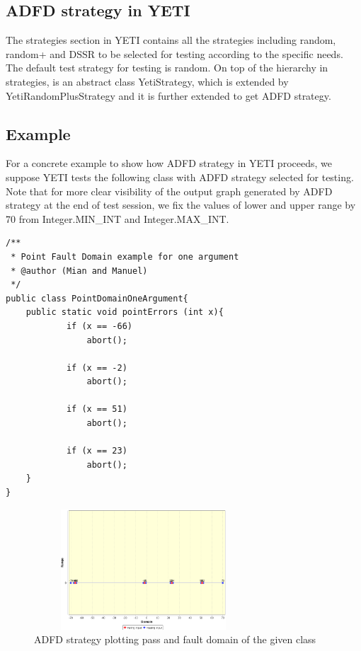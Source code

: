  \subsection{ADFD strategy in YETI}
The strategies section in YETI contains all the strategies including random, random+ and DSSR to be selected for testing according to the specific needs. The default test strategy for testing is random. On top of the hierarchy in strategies, is an abstract class YetiStrategy, which is extended by YetiRandomPlusStrategy and it is further extended to get ADFD strategy.
 

\subsection{Example}\label{sec:example}
For a concrete example to show how ADFD strategy in YETI proceeds, we suppose YETI tests the following class with ADFD strategy selected for testing. Note that for more clear visibility of the output graph generated by ADFD strategy at the end of test session, we fix the values of lower and upper range by 70 from Integer.MIN\_INT and Integer.MAX\_INT. 

\begin{lstlisting}
/**
 * Point Fault Domain example for one argument
 * @author (Mian and Manuel)
 */
public class PointDomainOneArgument{
	public static void pointErrors (int x){
     		if (x == -66)
       			abort();
     
     		if (x == -2)
     			abort();
      				
     		if (x == 51)
     			abort();
     
     		if (x == 23)
     			abort();
	}
}
\end{lstlisting}


\begin{figure}[H]
\centering
\includegraphics[width=8.2cm,height=4.5cm]{chapter5/pointDomainOneArgument.png}
\caption{ADFD strategy plotting pass and fault domain of the given class}
\label{fig:ADFD-example}
\end{figure}

